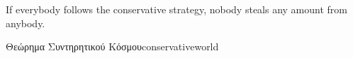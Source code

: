   \label{conservativeworld}
  If everybody follows the conservative strategy, nobody steals any amount from anybody.
\begin{theoremgr}{Θεώρημα Συντηρητικού Κόσμου}{conservativeworld} \ \\
\end{theoremgr}
